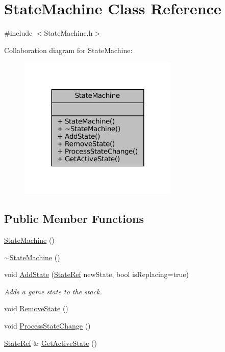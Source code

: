 \hypertarget{classStateMachine}{}\section{State\+Machine Class Reference}
\label{classStateMachine}


{\ttfamily \#include $<$State\+Machine.\+h$>$}



Collaboration diagram for State\+Machine\+:\nopagebreak
\begin{figure}[H]
\begin{center}
\leavevmode
\includegraphics[width=215pt]{classStateMachine__coll__graph}
\end{center}
\end{figure}
\subsection*{Public Member Functions}
\begin{DoxyCompactItemize}
\item 
\mbox{\hyperlink{classStateMachine_a2fb07002510ea9141019559750acfab8}{State\+Machine}} ()
\item 
\mbox{\hyperlink{classStateMachine_a93d66cb2a89b186789d655a08b02674e}{$\sim$\+State\+Machine}} ()
\item 
void \mbox{\hyperlink{classStateMachine_a0ce4894da8a4f2312b1035713fb48c08}{Add\+State}} (\mbox{\hyperlink{StateMachine_8h_a217d9c9b187e9dd27abb46be48fb014d}{State\+Ref}} new\+State, bool is\+Replacing=true)
\begin{DoxyCompactList}\small\item\em Adds a game state to the stack. \end{DoxyCompactList}\item 
void \mbox{\hyperlink{classStateMachine_aebefd3cef7db9e011e15f423061d1afc}{Remove\+State}} ()
\item 
void \mbox{\hyperlink{classStateMachine_a6758b622d0428a6ed72127cd5cbf1813}{Process\+State\+Change}} ()
\item 
\mbox{\hyperlink{StateMachine_8h_a217d9c9b187e9dd27abb46be48fb014d}{State\+Ref}} \& \mbox{\hyperlink{classStateMachine_a8ae5f91aa501e0fa07478d087814906e}{Get\+Active\+State}} ()
\end{DoxyCompactItemize}


